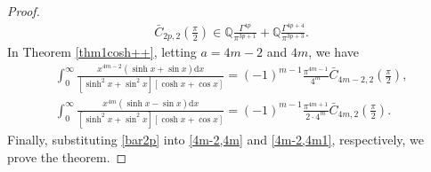 \documentclass[11pt]{article}
\theoremstyle{plain}
\theoremstyle{definition}
\begin{document}
\begin{proof}
\begin{align} \label{bar2p}
\bar{C}_{2p,2}\left( \frac{\pi}{2} \right) \in \mathbb{Q} \frac{\Gamma ^{4p}}{\pi ^{3p+1}}+\mathbb{Q} \frac{\Gamma ^{4p+4}}{\pi ^{3p+3}}.
\end{align}
In Theorem \ref{thm1cosh++}, letting  $a=4m-2$ and $4m$, we have
\begin{align} \label{4m-2,4m}
\int_0^{\infty}{\frac{x^{4m-2}\left( \sinh x+\sin x \right) \mathrm{d}x}{\left[ \sinh ^2x+\sin ^2x \right] \left[ \cosh x+\cos x \right]}}=
\left( -1 \right) ^{m-1}\frac{\pi ^{4m-1}}{4^m}\bar{C}_{4m-2,2}\left( \frac{\pi}{2} \right)
,\\
\int_0^{\infty}{\frac{x^{4m}\left( \sinh x-\sin x \right) \mathrm{d}x}{\left[ \sinh^2x+\sin ^2x \right] \left[ \cosh x+\cos x \right]}}
=\left( -1 \right) ^{m-1}\frac{\pi ^{4m+1}}{2\cdot 4^m}\bar{C}_{4m,2}\left( \frac{\pi}{2} \right) \label{4m-2,4m1}
.
\end{align}
Finally, substituting \eqref{bar2p} into \eqref{4m-2,4m} and \eqref{4m-2,4m1}, respectively, we prove the theorem.
\end{proof}
\end{document}
